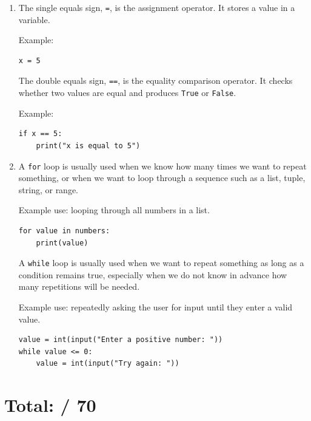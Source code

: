 \documentclass[12pt]{article}
\begin{document}
\begin{enumerate}[resume,label=\arabic*.]
    \item The single equals sign, \texttt{=}, is the assignment operator. It stores a value in a variable.

Example:
\begin{lstlisting}
x = 5
\end{lstlisting}

The double equals sign, \texttt{==}, is the equality comparison operator. It checks whether two values are equal and produces \texttt{True} or \texttt{False}.

Example:
\begin{lstlisting}
if x == 5:
    print("x is equal to 5")
\end{lstlisting}

    \item A \texttt{for} loop is usually used when we know how many times we want to repeat something, or when we want to loop through a sequence such as a list, tuple, string, or range.

Example use: looping through all numbers in a list.

\begin{lstlisting}
for value in numbers:
    print(value)
\end{lstlisting}

A \texttt{while} loop is usually used when we want to repeat something as long as a condition remains true, especially when we do not know in advance how many repetitions will be needed.

Example use: repeatedly asking the user for input until they enter a valid value.

\begin{lstlisting}
value = int(input("Enter a positive number: "))
while value <= 0:
    value = int(input("Try again: "))
\end{lstlisting}
\end{enumerate}

\section*{Total: \underline{\hspace{2cm}} / 70}
\end{document}
